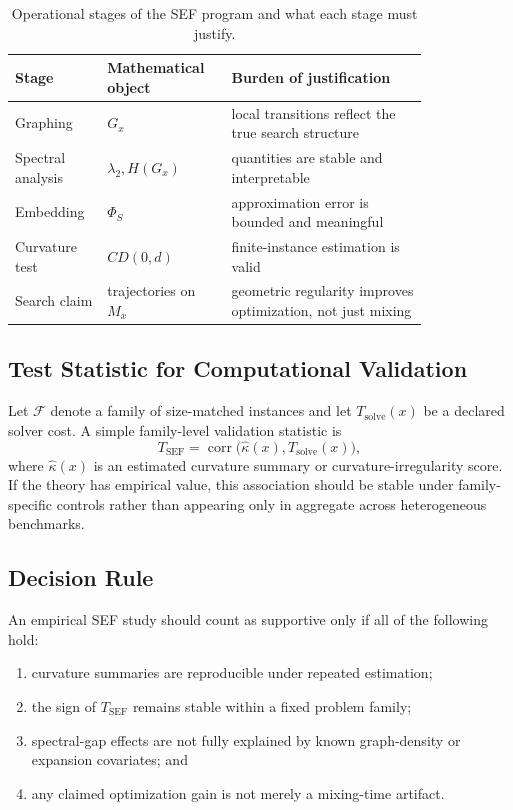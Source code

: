 \documentclass{svjour3}
\begin{document}
\begin{table}[t]
\centering
\small
\caption{Operational stages of the SEF program and what each stage must justify.}
\label{tab:sef-stages}
\small
\begin{tabular}{@{}p{0.16\linewidth}p{0.24\linewidth}p{0.42\linewidth}@{}}
\toprule
Stage & Mathematical object & Burden of justification \\
\midrule
Graphing & $G_x$ & local transitions reflect the true search structure \\
Spectral analysis & $\lambda_2, H(G_x)$ & quantities are stable and interpretable \\
Embedding & $\Phi_S$ & approximation error is bounded and meaningful \\
Curvature test & $CD(0,d)$ & finite-instance estimation is valid \\
Search claim & trajectories on $M_x$ & geometric regularity improves optimization, not just mixing \\
\bottomrule
\end{tabular}
\end{table}

\subsection{Test Statistic for Computational Validation}
Let $\mathcal{F}$ denote a family of size-matched instances and let $T_{\mathrm{solve}}(x)$ be a declared solver cost. A simple family-level validation statistic is
\[
T_{\mathrm{SEF}} = \operatorname{corr}\!\bigl(\widehat{\kappa}(x), T_{\mathrm{solve}}(x)\bigr),
\]
where $\widehat{\kappa}(x)$ is an estimated curvature summary or curvature-irregularity score. If the theory has empirical value, this association should be stable under family-specific controls rather than appearing only in aggregate across heterogeneous benchmarks.

\subsection{Decision Rule}
An empirical SEF study should count as supportive only if all of the following hold:
\begin{enumerate}[leftmargin=*]
\item curvature summaries are reproducible under repeated estimation;
\item the sign of $T_{\mathrm{SEF}}$ remains stable within a fixed problem family;
\item spectral-gap effects are not fully explained by known graph-density or expansion covariates; and
\item any claimed optimization gain is not merely a mixing-time artifact.
\end{enumerate}
\end{document}
